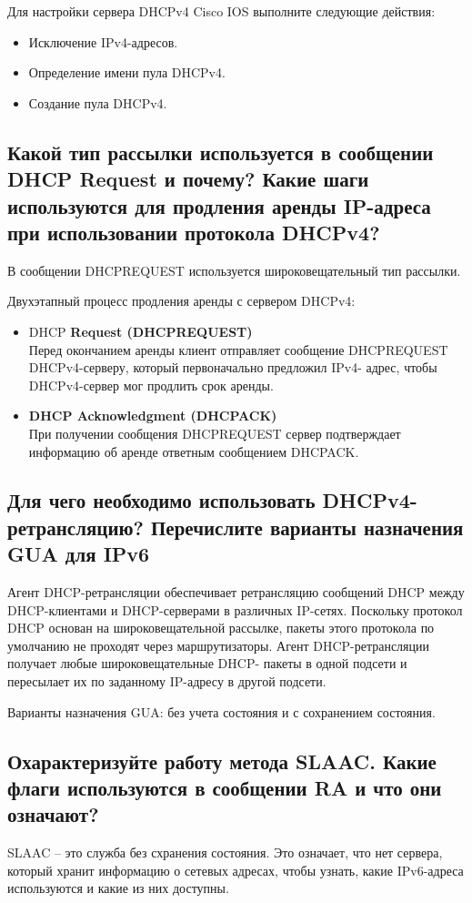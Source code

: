 Для настройки сервера DHCPv4 Cisco IOS выполните следующие
действия:
\begin{itemize}
    \item Исключение IPv4-адресов.
    \item Определение имени пула DHCPv4.
    \item Создание пула DHCPv4.
\end{itemize}

\subsection{Какой тип рассылки используется в сообщении DHCP Request и
почему? Какие шаги используются для продления аренды IP-адреса
при использовании протокола DHCPv4?}
В сообщении DHCPREQUEST используется широковещательный тип
рассылки.

Двухэтапный процесс продления аренды с сервером DHCPv4:
\begin{itemize}
    \item DHCP \textbf{Request (DHCPREQUEST)}\\
    Перед окончанием аренды клиент отправляет сообщение
    DHCPREQUEST DHCPv4-серверу, который первоначально предложил IPv4-
    адрес, чтобы DHCPv4-сервер мог продлить срок аренды.
    \item \textbf{DHCP Acknowledgment (DHCPACK)}\\
    При получении сообщения DHCPREQUEST сервер подтверждает
    информацию об аренде ответным сообщением DHCPACK.
\end{itemize}

\subsection{Для чего необходимо использовать DHCPv4-ретрансляцию?
Перечислите варианты назначения GUA для IPv6}
Агент DHCP-ретрансляции обеспечивает ретрансляцию сообщений
DHCP между DHCP-клиентами и DHCP-серверами в различных IP-сетях.
Поскольку протокол DHCP основан на широковещательной рассылке,
пакеты этого протокола по умолчанию не проходят через маршрутизаторы.
Агент DHCP-ретрансляции получает любые широковещательные DHCP-
пакеты в одной подсети и пересылает их по заданному IP-адресу в другой
подсети.

Варианты назначения GUA: без учета состояния и с сохранением
состояния.

\subsection{Охарактеризуйте работу метода SLAAC. Какие флаги
используются в сообщении RA и что они означают?}
SLAAC – это служба без схранения состояния. Это означает, что нет
сервера, который хранит информацию о сетевых адресах, чтобы узнать,
какие IPv6-адреса используются и какие из них доступны.

